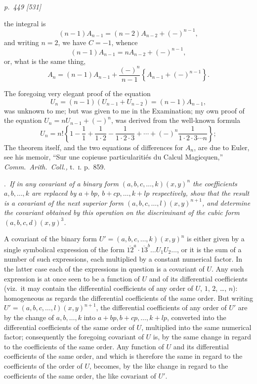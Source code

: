\documentclass[11pt,a4paper]{book}
\begin{document}
\bigskip
\textit{p.~449 [531]}
\smallskip

the integral is
\[
(n-1)A_{n-1} = (n-2)A_{n-2} + (-)^{n-1},
\]
and writing $n = 2$, we have $C = -1$, whence
\[
(n-1)A_{n-1} = nA_{n-2} + (-)^{n-1},
\]
or, what is the same thing,
\[
A_n = (n-1)A_{n-1} + \frac{(-)^n}{n-1}\left\{A_{n-1} + (-)^{n-1}\right\}.
\]

The foregoing very elegant proof of the equation
\[
U_n = (n-1)(U_{n-1} + U_{n-2}) = (n-1)A_{n-1},
\]
was unknown to me; but was given to me in the Examination; my own proof of the
equation $U_n = nU_{n-1} + (-)^n$, was derived from the well-known formula
\[
U_n = n!\left\{1 - \frac{1}{1} + \frac{1}{1\cdot 2} - \frac{1}{1\cdot 2\cdot 3} + \cdots + (-)^n\frac{1}{1\cdot 2\cdot 3\cdots n}\right\};
\]
The theorem itself, and the two equations of differences for $A_n$, are due to Euler, see
his memoir, ``Sur une copieuse particulariti\'es du Calcul Magicquen,'' \textit{Comm.\ Arith.\ Coll.,} t.~\textsc{i.}
p.~859.

\medskip
{}.\ \textit{If in any covariant of a binary form $(a, b, c, \ldots, k)(x, y)^n$ the coefficients
$a, b, \ldots, k$ are replaced by $a + bp$, $b + cp, \ldots, k + lp$ respectively, show that the result is
a covariant of the next superior form $(a, b, c, \ldots, l)(x, y)^{n+1}$, and determine the covariant
obtained by this operation on the discriminant of the cubic form $(a, b, c, d)(x, y)^3$.}

\medskip

A covariant of the binary form $U' = (a, b, c, \ldots, k)(x, y)^n$ is either given by a single
symbolical expression of the form $\overline{12}^a \cdot \overline{13}^b \ldots U_1U_2 \ldots$, or it is the sum of a
number of such expressions, each multiplied by a constant numerical factor. In the
latter case each of the expressions in question is a covariant of $U$. Any such
expression is at once seen to be a function of $U$ and of its differential coefficients
(viz.\ it may contain the differential coefficients of any order of $U$, $1$, $2$, \ldots, $n$):
homogeneous as regards the differential coefficients of the same order. But writing
$U' = (a, b, c, \ldots, l)(x, y)^{n+1}$, the differential coefficients of any order of $U'$ are by the
change of $a, b, \ldots, k$ into $a + bp, b + cp, \ldots, k + lp$, converted into the differential
coefficients of the same order of $U$, multiplied into the same numerical factor; consequently the foregoing covariant of $U$ is, by the same change in regard to the coefficients of the same order. Any function of $U$ and its differential coefficients of the same order, and which is therefore the same in regard to the coefficients of the order of $U$, becomes, by the like change in regard to the coefficients of the same order, the like covariant of $U'$.
\end{document}
